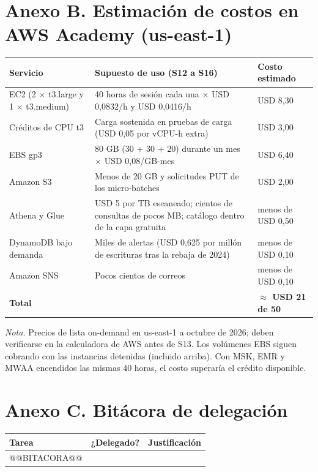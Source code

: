\documentclass[12pt,letterpaper]{article}
\begin{document}
\section*{Anexo B. Estimación de costos en AWS Academy (us-east-1)}
\begin{footnotesize}
\begin{tabular}{@{}P{1.55in}P{3.3in}P{1.45in}@{}}
\toprule
\textbf{Servicio} & \textbf{Supuesto de uso (S12 a S16)} & \textbf{Costo estimado}\\
\midrule
EC2 (2 $\times$ t3.large y 1 $\times$ t3.medium) & 40 horas de sesión cada una $\times$ USD 0,0832/h y USD 0,0416/h & USD 8,30\\
Créditos de CPU t3 & Carga sostenida en pruebas de carga (USD 0,05 por vCPU-h extra) & USD 3,00\\
EBS gp3 & 80 GB (30 + 30 + 20) durante un mes $\times$ USD 0,08/GB-mes & USD 6,40\\
Amazon S3 & Menos de 20 GB y solicitudes PUT de los micro-batches & USD 2,00\\
Athena y Glue & USD 5 por TB escaneado; cientos de consultas de pocos MB; catálogo dentro de la capa gratuita & menos de USD 0,50\\
DynamoDB bajo demanda & Miles de alertas (USD 0,625 por millón de escrituras tras la rebaja de 2024) & menos de USD 0,10\\
Amazon SNS & Pocos cientos de correos & menos de USD 0,10\\
\midrule
\textbf{Total} & & \textbf{$\approx$ USD 21 de 50}\\
\bottomrule
\end{tabular}

\vspace{3pt}
\noindent\emph{Nota.} Precios de lista on-demand en us-east-1 a octubre de 2026; deben verificarse en la calculadora de AWS antes de S13. Los volúmenes EBS siguen cobrando con las instancias detenidas (incluido arriba). Con MSK, EMR y MWAA encendidos las mismas 40 horas, el costo superaría el crédito disponible.
\end{footnotesize}

\section*{Anexo C. Bitácora de delegación}
\begin{footnotesize}
\begin{tabular}{@{}P{2.2in}P{0.85in}P{3.25in}@{}}
\toprule
\textbf{Tarea} & \textbf{¿Delegado?} & \textbf{Justificación}\\
\midrule
@@BITACORA@@
\bottomrule
\end{tabular}
\end{footnotesize}
\end{document}
